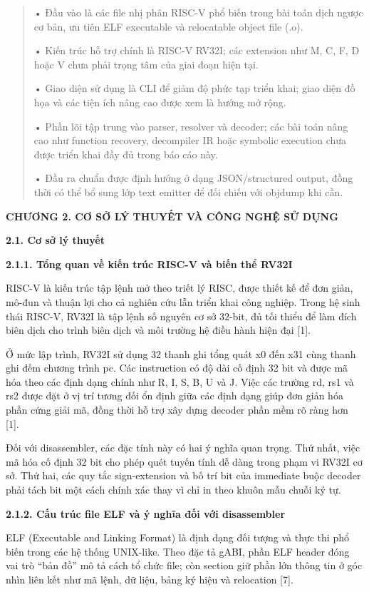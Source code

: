 \documentclass[
]{article}
\begin{document}
\begin{quote}
• Đầu vào là các file nhị phân RISC-V phổ biến trong bài toán dịch ngược
cơ bản, ưu tiên ELF executable và relocatable object file (.o).

• Kiến trúc hỗ trợ chính là RISC-V RV32I; các extension như M, C, F, D
hoặc V chưa phải trọng tâm của giai đoạn hiện tại.

• Giao diện sử dụng là CLI để giảm độ phức tạp triển khai; giao diện đồ
họa và các tiện ích nâng cao được xem là hướng mở rộng.

• Phần lõi tập trung vào parser, resolver và decoder; các bài toán nâng
cao như function recovery, decompiler IR hoặc symbolic execution chưa
được triển khai đầy đủ trong báo cáo này.

• Đầu ra chuẩn được định hướng ở dạng JSON/structured output, đồng thời
có thể bổ sung lớp text emitter để đối chiếu với objdump khi cần.
\end{quote}

\textbf{CHƯƠNG 2. CƠ SỞ LÝ THUYẾT VÀ CÔNG NGHỆ SỬ DỤNG}

\textbf{2.1. Cơ sở lý thuyết}

\textbf{2.1.1. Tổng quan về kiến trúc RISC-V và biến thể RV32I}

RISC-V là kiến trúc tập lệnh mở theo triết lý RISC, được thiết kế để đơn
giản, mô-đun và thuận lợi cho cả nghiên cứu lẫn triển khai công nghiệp.
Trong hệ sinh thái RISC-V, RV32I là tập lệnh số nguyên cơ sở 32-bit, đủ
tối thiểu để làm đích biên dịch cho trình biên dịch và môi trường hệ
điều hành hiện đại {[}1{]}.

Ở mức lập trình, RV32I sử dụng 32 thanh ghi tổng quát x0 đến x31 cùng
thanh ghi đếm chương trình pc. Các instruction có độ dài cố định 32 bit
và được mã hóa theo các định dạng chính như R, I, S, B, U và J. Việc các
trường rd, rs1 và rs2 được đặt ở vị trí tương đối ổn định giữa các định
dạng giúp đơn giản hóa phần cứng giải mã, đồng thời hỗ trợ xây dựng
decoder phần mềm rõ ràng hơn {[}1{]}.

Đối với disassembler, các đặc tính này có hai ý nghĩa quan trọng. Thứ
nhất, việc mã hóa cố định 32 bit cho phép quét tuyến tính dễ dàng trong
phạm vi RV32I cơ sở. Thứ hai, các quy tắc sign-extension và bố trí bit
của immediate buộc decoder phải tách bit một cách chính xác thay vì chỉ
in theo khuôn mẫu chuỗi ký tự.

\textbf{2.1.2. Cấu trúc file ELF và ý nghĩa đối với disassembler}

ELF (Executable and Linking Format) là định dạng đối tượng và thực thi
phổ biến trong các hệ thống UNIX-like. Theo đặc tả gABI, phần ELF header
đóng vai trò ``bản đồ'' mô tả cách tổ chức file; còn section giữ phần
lớn thông tin ở góc nhìn liên kết như mã lệnh, dữ liệu, bảng ký hiệu và
relocation {[}7{]}.
\end{document}
